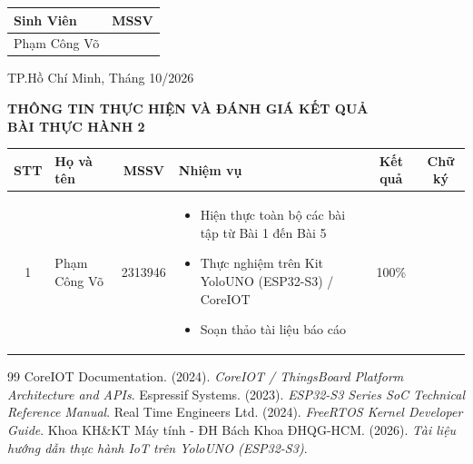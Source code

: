 \documentclass[a4paper]{article}
\begin{document}
\begin{titlepage}
\begin{center}
{\fontsize{13}{14}\selectfont
\begin{tabular}{|>{\centering\arraybackslash}p{7cm}|>{\centering\arraybackslash}p{4cm}|}
\hline
\textbf{Sinh Viên} & \textbf{MSSV} \\
\hline

Phạm Công Võ & 2313946 \\
\hline

\end{tabular}
}
\end{center}


\vspace{1.8cm}
\begin{center}
{\large TP.Hồ Chí Minh, Tháng 10/2026}
\end{center}
\end{titlepage}
\restoregeometry
\restoregeometry

\newpage
\begin{center}
    \textbf{\Large THÔNG TIN THỰC HIỆN VÀ ĐÁNH GIÁ KẾT QUẢ}\\[1ex]
    \textbf{\large BÀI THỰC HÀNH 2}
\end{center}

\vspace{1.5em}

\begin{longtable}{|c|m{4cm}|c|m{4.5cm}|c|c|}
\hline
\textbf{STT} & \textbf{\centering Họ và tên} & \textbf{MSSV} & \textbf{\centering Nhiệm vụ} & \textbf{Kết quả} & \textbf{Chữ ký} \\
\hline
1 & Phạm Công Võ & 2313946 & \begin{itemize}[leftmargin=*]
    \item Hiện thực toàn bộ các bài tập từ Bài 1 đến Bài 5
    \item Thực nghiệm trên Kit YoloUNO (ESP32-S3) / CoreIOT
    \item Soạn thảo tài liệu báo cáo
\end{itemize} & 100\% & \\
\hline
\end{longtable}

\newpage
\tableofcontents
\newpage



\newpage
{}
\begin{thebibliography}{99}
CoreIOT Documentation. (2024). \textit{CoreIOT / ThingsBoard Platform Architecture and APIs}.
Espressif Systems. (2023). \textit{ESP32-S3 Series SoC Technical Reference Manual}.
Real Time Engineers Ltd. (2024). \textit{FreeRTOS Kernel Developer Guide}.
Khoa KH\&KT Máy tính - ĐH Bách Khoa ĐHQG-HCM. (2026). \textit{Tài liệu hướng dẫn thực hành IoT trên YoloUNO (ESP32-S3)}.
\end{thebibliography}
\end{document}
